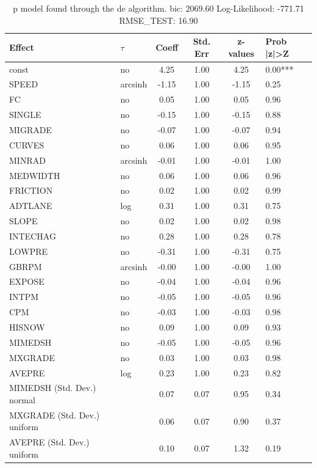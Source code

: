 \begin{table}
	\caption{p model found through the de algorithm. bic: 2069.60 Log-Likelihood: -771.71 RMSE_TEST: 16.90}
	\begin{center}
		\begin{tabular}{|l|l|c|c|c|l|}
			\hline
			Effect & $\tau$ & Coeff & Std. Err & z-values & Prob |z|>Z \\
			\hline
			const & no & 4.25 & 1.00 & 4.25 & 0.00*** \\
			\hline
			SPEED & arcsinh & -1.15 & 1.00 & -1.15 & 0.25 \\
			\hline
			FC & no & 0.05 & 1.00 & 0.05 & 0.96 \\
			\hline
			SINGLE & no & -0.15 & 1.00 & -0.15 & 0.88 \\
			\hline
			MIGRADE & no & -0.07 & 1.00 & -0.07 & 0.94 \\
			\hline
			CURVES & no & 0.06 & 1.00 & 0.06 & 0.95 \\
			\hline
			MINRAD & arcsinh & -0.01 & 1.00 & -0.01 & 1.00 \\
			\hline
			MEDWIDTH & no & 0.06 & 1.00 & 0.06 & 0.96 \\
			\hline
			FRICTION & no & 0.02 & 1.00 & 0.02 & 0.99 \\
			\hline
			ADTLANE & log & 0.31 & 1.00 & 0.31 & 0.75 \\
			\hline
			SLOPE & no & 0.02 & 1.00 & 0.02 & 0.98 \\
			\hline
			INTECHAG & no & 0.28 & 1.00 & 0.28 & 0.78 \\
			\hline
			LOWPRE & no & -0.31 & 1.00 & -0.31 & 0.75 \\
			\hline
			GBRPM & arcsinh & -0.00 & 1.00 & -0.00 & 1.00 \\
			\hline
			EXPOSE & no & -0.04 & 1.00 & -0.04 & 0.96 \\
			\hline
			INTPM & no & -0.05 & 1.00 & -0.05 & 0.96 \\
			\hline
			CPM & no & -0.03 & 1.00 & -0.03 & 0.98 \\
			\hline
			HISNOW & no & 0.09 & 1.00 & 0.09 & 0.93 \\
			\hline
			MIMEDSH & no & -0.05 & 1.00 & -0.05 & 0.96 \\
			\hline
			MXGRADE & no & 0.03 & 1.00 & 0.03 & 0.98 \\
			\hline
			AVEPRE & log & 0.23 & 1.00 & 0.23 & 0.82 \\
			\hline
			MIMEDSH (Std. Dev.) normal &  & 0.07 & 0.07 & 0.95 & 0.34 \\
			\hline
			MXGRADE (Std. Dev.) uniform &  & 0.06 & 0.07 & 0.90 & 0.37 \\
			\hline
			AVEPRE (Std. Dev.) uniform &  & 0.10 & 0.07 & 1.32 & 0.19 \\
			\hline
		\end{tabular}
	\end{center}
\end{table}